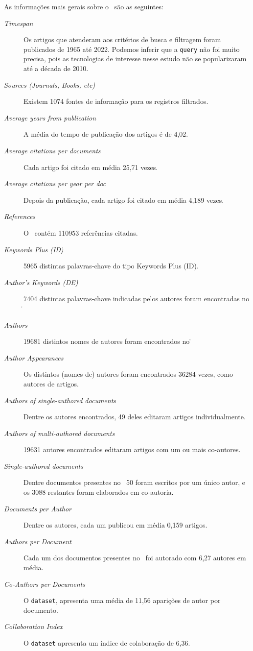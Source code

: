As informações mais gerais sobre o \dataset\ são as seguintes:
\begin{description}
    \item [\textit{Timespan}] Os artigos que atenderam aos critérios de busca e filtragem foram publicados de 1965 até 2022. Podemos inferir que a \texttt{query} não foi muito precisa, pois as tecnologias de interesse nesse estudo não se popularizaram até a década de 2010.
    \item [\textit{Sources (Journals, Books, etc)}] Existem 1074 fontes de informação para os registros filtrados.
    \item [\textit{Average years from publication}] A média do tempo de publicação dos artigos é de 4,02.
    \item [\textit{Average citations per documents}] Cada artigo foi citado em média 25,71 vezes.
    \item [\textit{Average citations per year per doc}] Depois da publicação, cada artigo foi citado em média 4,189 vezes.
    \item [\textit{References}] O \dataset\ contém 110953 referências citadas.
    \item [\textit{Keywords Plus (ID)}] 5965 distintas palavras-chave do tipo Keywords Plus (ID). 
    \item [\textit{Author's Keywords (DE)}] 7404 distintas palavras-chave indicadas pelos autores foram encontradas no \dataset\.
    \item [\textit{Authors}] 19681 distintos nomes de autores foram encontrados no \dataset\.
    \item [\textit{Author Appearances}] Os distintos (nomes de) autores foram encontrados 36284 vezes, como autores de artigos.
    \item [\textit{Authors of single-authored documents}] Dentre os autores encontrados, 49 deles editaram artigos individualmente.
    \item [\textit{Authors of multi-authored documents}] 19631 autores encontrados editaram artigos com um ou mais co-autores.
    \item [\textit{Single-authored documents}] Dentre documentos presentes no \dataset\, 50 foram escritos por um único autor, e os 3088 restantes foram elaborados em co-autoria.
    \item [\textit{Documents per Author}] Dentre os autores, cada um publicou em média 0,159 artigos.
    \item [\textit{Authors per Document}] Cada um dos documentos presentes no \dataset\ foi autorado com 6,27 autores em média.
    \item [\textit{Co-Authors per Documents}] O \texttt{dataset}, apresenta uma média de 11,56 aparições de autor por documento.
    \item [\textit{Collaboration Index}] O \texttt{dataset} apresenta um índice de colaboração de 6,36. 
\end{description}

